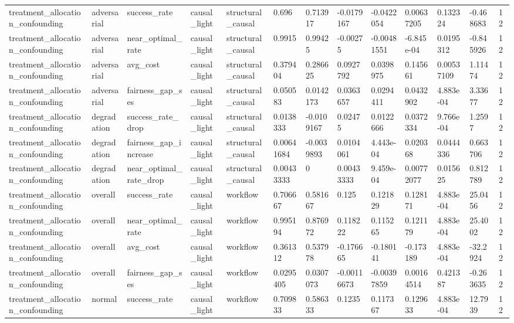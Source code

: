 \begin{tabular}{lllllllllllll}
treatment\_allocation\_confounding & adversarial & success\_rate & causal\_light & structural\_causal & 0.696 & 0.713917 & -0.0179167 & -0.0422054 & 0.00637205 & 0.132324 & -0.468683 & 12 \\
treatment\_allocation\_confounding & adversarial & near\_optimal\_rate & causal\_light & structural\_causal & 0.9915 & 0.99425 & -0.00275 & -0.00481551 & -6.845e-04 & 0.0195312 & -0.845926 & 12 \\
treatment\_allocation\_confounding & adversarial & avg\_cost & causal\_light & structural\_causal & 0.379404 & 0.286625 & 0.0927792 & 0.0398975 & 0.145661 & 0.00537109 & 1.11474 & 12 \\
treatment\_allocation\_confounding & adversarial & fairness\_gap\_ses & causal\_light & structural\_causal & 0.050583 & 0.0142173 & 0.0363657 & 0.0294411 & 0.0432902 & 4.883e-04 & 3.33677 & 12 \\
treatment\_allocation\_confounding & degradation & success\_rate\_drop & causal\_light & structural\_causal & 0.0138333 & -0.0109167 & 0.02475 & 0.0122666 & 0.0372334 & 9.766e-04 & 1.2597 & 12 \\
treatment\_allocation\_confounding & degradation & fairness\_gap\_increase & causal\_light & structural\_causal & 0.00641684 & -0.0039893 & 0.0104061 & 4.443e-04 & 0.020368 & 0.0444336 & 0.663706 & 12 \\
treatment\_allocation\_confounding & degradation & near\_optimal\_rate\_drop & causal\_light & structural\_causal & 0.00433333 & 0 & 0.00433333 & 9.459e-04 & 0.00772077 & 0.015625 & 0.812789 & 12 \\
treatment\_allocation\_confounding & overall & success\_rate & causal\_light & workflow & 0.706667 & 0.581667 & 0.125 & 0.121829 & 0.128171 & 4.883e-04 & 25.0456 & 12 \\
treatment\_allocation\_confounding & overall & near\_optimal\_rate & causal\_light & workflow & 0.995194 & 0.876972 & 0.118222 & 0.115265 & 0.121179 & 4.883e-04 & 25.4002 & 12 \\
treatment\_allocation\_confounding & overall & avg\_cost & causal\_light & workflow & 0.361312 & 0.537978 & -0.176665 & -0.180141 & -0.173189 & 4.883e-04 & -32.2924 & 12 \\
treatment\_allocation\_confounding & overall & fairness\_gap\_ses & causal\_light & workflow & 0.0295405 & 0.0307073 & -0.00116673 & -0.00397859 & 0.00164514 & 0.421387 & -0.263635 & 12 \\
treatment\_allocation\_confounding & normal & success\_rate & causal\_light & workflow & 0.709833 & 0.586333 & 0.1235 & 0.117367 & 0.129633 & 4.883e-04 & 12.7939 & 12 \\

\end{tabular}
